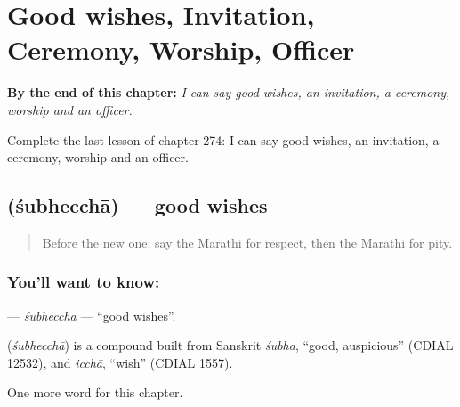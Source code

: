 
\chapter{Good wishes, Invitation, Ceremony, Worship, Officer}
\label{ch:mr-good-wishes-invitation-ceremony-worship-officer}

\begin{chapteropening}
\textbf{By the end of this chapter:} \emph{I can say good wishes, an invitation, a ceremony, worship and an officer.}

Complete the last lesson of chapter 274: I can say good wishes, an invitation, a ceremony, worship and an officer.
\end{chapteropening}

\section[\texorpdfstring{\mr{शुभेच्छा} (śubhecchā)}{शुभेच्छा (śubhecchā)}]{ (śubhecchā) — good wishes}

\label{lesson:MR-C274-subheccha}



\begin{quote}
Before the new one: say the Marathi for respect, then the Marathi for pity.
\end{quote}

\subsection*{You'll want to know: }
\textbf{} — \emph{śubhecchā} — \textquotedblleft{}good wishes\textquotedblright{}.

\begin{cousinweb}
\textbf{} (\emph{śubhecchā}) is a compound built from Sanskrit \emph{śubha}, \textquotedblleft{}good, auspicious\textquotedblright{} (CDIAL 12532), and \emph{icchā}, \textquotedblleft{}wish\textquotedblright{} (CDIAL 1557).
\end{cousinweb}

\begin{grammarlens}[title={What you've built}]
One more word for this chapter.
\end{grammarlens}


